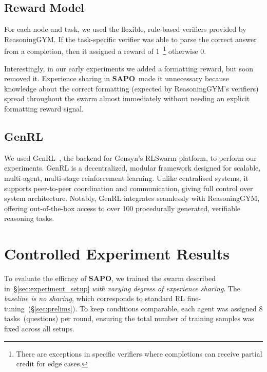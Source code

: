 \documentclass[11pt, a4paper, logo, singlecolumn, copyright]{gensyn}
\newcommand{\SAPO}{\textbf{SAPO}}
\begin{document}
\subsection{Reward Model}\label{subsec:rewards}
For each node and task, we used the flexible, rule-based verifiers provided by ReasoningGYM. If the task-specific verifier was able to parse the correct answer from a completion, then it assigned a reward of $1$~\footnote{There are exceptions in specific verifiers where completions can receive partial credit for edge cases.} otherwise $0$. 

Interestingly, in our early experiments we added a formatting reward, but soon removed it. Experience sharing in \SAPO~made it unnecessary because knowledge about the correct formatting (expected by ReasoningGYM’s verifiers) spread throughout the swarm almost immediately without needing an explicit formatting reward signal.


\subsection{GenRL}
We used GenRL~\citep{gensyn2025genrl}, the backend for Gensyn’s RLSwarm platform, to perform our experiments. GenRL is a decentralized, modular framework designed for scalable, multi-agent, multi-stage reinforcement learning. Unlike centralised systems, it supports peer-to-peer coordination and communication, giving full control over system architecture. Notably, GenRL integrates seamlessly with ReasoningGYM, offering out-of-the-box access to over 100 procedurally generated, verifiable reasoning tasks.

\section{Controlled Experiment Results}\label{sec:results}

To evaluate the efficacy of \SAPO, we trained the swarm described in~\S\ref{sec:experiment_setup} \textit{with varying degrees of experience sharing}. The \textit{baseline is no sharing}, which corresponds to standard RL fine-tuning~(\S\ref{sec:prelims}). To keep conditions comparable, each agent was assigned 8 tasks~(questions) per round, ensuring the total number of training samples was fixed across all setups.
\end{document}
